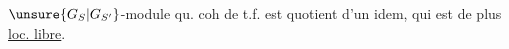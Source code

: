 
$\unsure{G_S|G_{S'}}$-module  qu. coh de t.f. est quotient d'un idem, qui est de plus \uline{loc. libre}.

